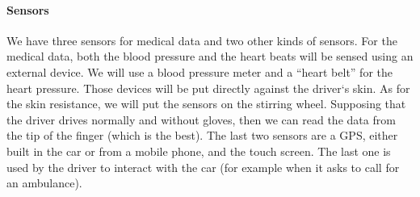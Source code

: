 \documentclass[a4paper]{article}		%
\begin{document}
\paragraph{Sensors} We have three sensors for medical data and two other kinds of sensors. For the medical data, both the blood pressure and the heart beats will be sensed using an external device. We will use a blood pressure meter and a “heart belt” for the heart pressure. Those devices will be put directly against the driver`s skin. As for the skin resistance, we will put the sensors on the stirring wheel. Supposing that the driver drives normally and without gloves, then we can read the data from the tip of the finger (which is the best). The last two sensors are a GPS, either built in the car or from a mobile phone, and the touch screen. The last one is used by the driver to interact with the car (for example when it asks to call for an ambulance).
\end{document}
